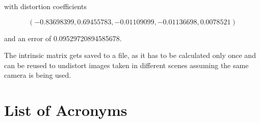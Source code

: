 \documentclass[bibliography=totoc]{scrartcl}
\begin{document}
with distortion coefficients

$$(-0.83698399, 0.69455783, -0.01109099, -0.01136698, 0.0078521)$$

and an error of 0.09529720894585678.

The intrinsic matrix gets saved to a file, as it has to be calculated only once and can be reused to undistort images taken in different scenes assuming the same camera is being used.



\clearpage
\section*{List of Acronyms}



\end{document}
